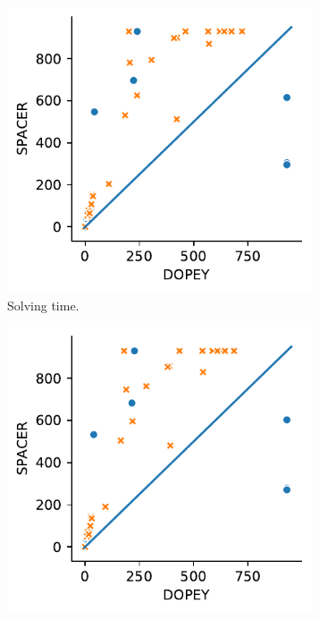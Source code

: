 \begin{figure}[t]
\begin{subfigure}[b]{0.24\textwidth}
    \includegraphics[width=0.99\textwidth]{figures/res-dpy_vs_spc_total_inside.pdf}
    \caption{Solving time.\linebreak}
    \label{subfig:dpy_vs_spc_total_sub}
  \end{subfigure}
  \begin{subfigure}[b]{0.24\textwidth}
  \centering
    \includegraphics[width=0.99\textwidth]{figures/res-dpy_vs_spc_smt_solver.pdf}

\end{subfigure}
\end{figure}
